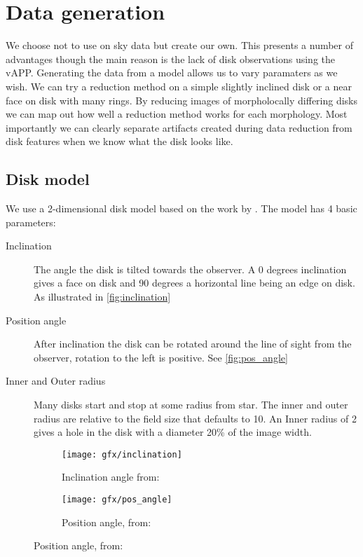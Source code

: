 
\chapter{Data generation} %
\label{ch:data_gen} %

We choose not to use on sky data but create our own. This presents a number of advantages though the main reason is the lack of disk observations using the \ac{vAPP}. Generating the data from a model allows us to vary paramaters as we wish. We can try a reduction method on a simple slightly inclined disk or a near face on disk with many rings. By reducing images of morpholocally differing disks we can map out how well a reduction method works for each morphology. Most importantly we can clearly separate artifacts created during data reduction from disk features when we know what the disk looks like.





\section{Disk model}

We use a 2-dimensional disk model based on the work by \cite{Pieter_Okko}. The model has 4 basic parameters: 

\begin{description}
\item[Inclination] The angle the disk is tilted towards the observer. A 0 degrees inclination gives a face on disk and 90 degrees a horizontal line being an edge on disk. As illustrated in \autoref{fig:inclination}
\item[Position angle] After inclination the disk can be rotated around the line of sight from the observer, rotation to the left is positive. See \autoref{fig:pos_angle}
\item[Inner and Outer radius] Many disks start and stop at some radius from star. The inner and outer radius are relative to the field size that defaults to 10. An Inner radius of 2 gives a hole in the disk with a diameter 20\% of the image width. 
\end{description}

\begin{figure}[h!]
  \centering
  \begin{subfigure}[b]{0.4\textwidth}
    \texttt{[image: gfx/inclination]}
    \caption{Inclination angle from: \cite{Pieter_Okko}}
    \label{fig:pos_angle}

  \end{subfigure}
  \begin{subfigure}[b]{0.4\textwidth}
    \texttt{[image: gfx/pos\_angle]}
    \caption{Position angle, from: \cite{Pieter_Okko}}
    \label{fig:inclination}
  \end{subfigure}
  \label{fig:1}
\end{figure}

